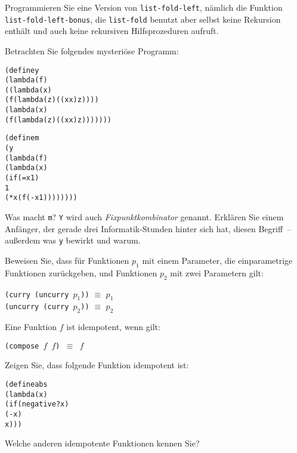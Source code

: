 \begin{aufgabe}
  Programmieren Sie eine Version von
  \texttt{list-fold-left}, nämlich die Funktion
  \texttt{list-fold-left-bonus}, die \texttt{list-fold} benutzt aber
  selbst keine Rekursion enthält und auch keine rekursiven
  Hilfsprozeduren aufruft.
\end{aufgabe}


\begin{aufgabe}
  Betrachten Sie folgendes mysteriöse Programm:
  \begin{alltt}
(define y
  (lambda (f)
    ((lambda (x)
       (f (lambda (z) ((x x) z))))
     (lambda (x)
       (f (lambda (z) ((x x) z)))))))

(define m
  (y
   (lambda (f)
     (lambda (x)
       (if (= x 1)
           1
           (* x (f (- x 1))))))))
   \end{alltt}
   Was macht \texttt{m}?  \texttt{Y} wird auch
   \textit{Fixpunktkombinator} genannt.  Erklären Sie einem Anfänger, der
   gerade drei Informatik-Stunden hinter sich hat, diesen Begriff~--
   außerdem was
   \texttt{y} bewirkt und warum.
 \end{aufgabe}

\begin{aufgabe}
  Beweisen Sie, dass für Funktionen $p_1$ mit einem Parameter, die
  einparametrige Funktionen zurückgeben, und Funktionen $p_2$ mit zwei
  Parametern gilt:
  \begin{center}
    \texttt{(curry (uncurry $p_1$))} $\equiv$ $p_1$\\
    \texttt{(uncurry (curry $p_2$))} $\equiv$ $p_2$
  \end{center}
 \end{aufgabe}

\begin{aufgabe}
  Eine Funktion $f$ ist idempotent, wenn gilt:

  \begin{center}
    \texttt{(compose $f$ $f$) $\equiv$ $f$}
  \end{center}

  Zeigen Sie, dass folgende Funktion idempotent ist:

  \begin{alltt}
    (define abs
      (lambda (x)
         (if (negative? x)
             (- x)
             x)))  \end{alltt}

  Welche anderen idempotente Funktionen kennen Sie?
\end{aufgabe}

